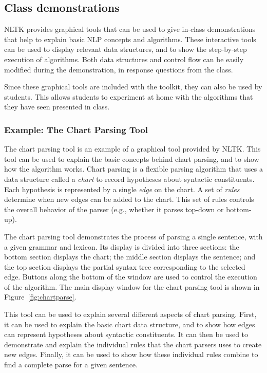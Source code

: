 \documentclass[11pt]{article}
\begin{document}
\subsection{Class demonstrations}

NLTK provides graphical tools that can be used to give in-class
demonstrations that help to explain basic NLP concepts and algorithms.
These interactive tools can be used to display relevant data
structures, and to show the step-by-step execution of algorithms.
Both data structures and control flow can be easily modified during
the demonstration, in response questions from the class.

Since these graphical tools are included with the toolkit, they can
also be used by students.  This allows students to experiment at home
with the algorithms that they have seen presented in class.

\subsubsection*{Example: The Chart Parsing Tool}

The chart parsing tool is an example of a graphical tool provided by
NLTK.  This tool can be used to explain the basic concepts behind
chart parsing, and to show how the algorithm works.  Chart parsing is
a flexible parsing algorithm that uses a data structure called a
\emph{chart} to record hypotheses about syntactic constituents.  Each
hypothesis is represented by a single \emph{edge} on the chart.  A set
of \emph{rules} determine when new edges can be added to the chart.
This set of rules controls the overall behavior of the parser (e.g.,
whether it parses top-down or bottom-up).

The chart parsing tool demonstrates the process of parsing a single
sentence, with a given grammar and lexicon.  Its display is divided
into three sections: the bottom section displays the chart; the middle
section displays the sentence; and the top section displays the
partial syntax tree corresponding to the selected edge.  Buttons along
the bottom of the window are used to control the execution of the
algorithm.  The main display window for the chart parsing tool is
shown in Figure~\ref{fig:chartparse}.   

This tool can be used to explain several different aspects of chart
parsing.  First, it can be used to explain the basic chart data
structure, and to show how edges can represent hypotheses about
syntactic constituents.  It can then be used to demonstrate and
explain the individual rules that the chart parsers uses to create new
edges.  Finally, it can be used to show how these individual rules
combine to find a complete parse for a given sentence.
\end{document}
